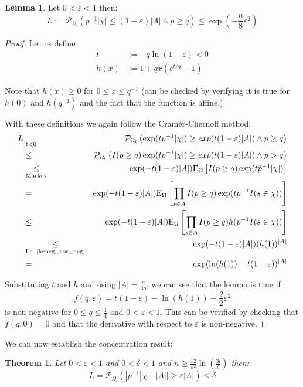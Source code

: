 \documentclass{article}
\newcommand{\prob}{\mathcal P}
\newcommand{\expectation}{\mathrm{E}}
\newcommand{\eps}{\varepsilon}
\newtheorem{theorem}{Theorem}
\theoremstyle{definition}
\newtheorem{lemma}{Lemma}
\begin{document}
\begin{lemma}\label{le:lower_tail}
Let $0 < \eps < 1$ then:
\[
  L := \prob_{\Omega_l} ( p^{-1} |\chi| \leq (1-\eps)|A| \wedge p \geq q) \leq \exp\left(-\frac{n}{8} \eps^2\right)
\]
\end{lemma}
\begin{proof}
Let us define
\begin{align*}
  t & := - q \ln(1-\eps) < 0 \\
  h(x) & := 1+q x (e^{t/q}-1)  
\end{align*}

Note that $h(x) \geq 0$ for $0 \leq x \leq q^{-1}$ (can be checked by verifying it is true for $h(0)$ and $h(q^{-1})$ and the fact that the function is affine.)

With these definitions we again follow the Cram\'{e}r-Chernoff method:
{\allowdisplaybreaks
\begin{eqnarray*}
  L & \underset{t<0}{=} & \prob_{\Omega_l} \left( \exp(t p^{-1} |\chi|) \geq exp(t (1-\eps)|A|) \wedge p \geq q \right) \\
    & \leq & \prob_{\Omega_l} \left( I(p \geq q) \exp(t p^{-1} |\chi|) \geq exp(t (1-\eps)|A|) \wedge p > q \right) \\
    & \underset{\textrm{Markov}}{\leq} & \exp( -t (1-\eps) |A| ) \expectation_\Omega \left[ I(p \geq q) \exp ( t \tilde{p}^{-1} |\chi| ) \right] \\
    & = & \exp( -t (1-\eps) |A| ) \expectation_\Omega \left[ \prod_{s \in A} I(p \geq q) \exp ( t \tilde{p}^{-1} I(s \in \chi) ) \right] \\
    & \leq & \exp( -t (1-\eps) |A| ) \expectation_\Omega \left[ \prod_{s \in A} I(p \geq q) h( p^{-1} I(s \in \chi) ) \right] \\
    & \underset{\textrm{Le.~\ref{le:neg_cor_neg}}}{\leq} & \exp( -t (1-\eps) |A| ) (h(1))^{|A|} \\
    & = & \exp( \ln(h(1)) -t (1-\eps) )^{|A|}
\end{eqnarray*}
}

Substituting $t$ and $h$ and using $|A| = \frac{n}{4q}$, we can see that the lemma is true if
\[
  f(q,\eps) = t (1-\eps) - \ln(h(1)) - \frac{q}{2} \eps^2
\]
is non-negative for $0 \leq q \leq \frac{1}{4}$ and $0 < \eps < 1$.
This can be verified by checking that $f(q,0) = 0$ and that the derivative with respect to $\eps$ is non-negative.
\end{proof}
We can now establish the concentration result:
\begin{theorem}
Let $0 < \eps < 1$ and $0 < \delta < 1$ and $n \geq \frac{12}{\eps^2} \ln\left(\frac{3l}{\delta}\right)$ then:
\[
  L = \prob_{\Omega_l} \left( | p^{-1} |\chi| - |A| | \geq \eps |A| \right) \leq \delta
\]
\end{theorem}
\end{document}
